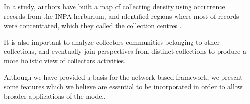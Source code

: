 In a study, authors have built a map of collecting density using occurrence records from the INPA herbarium, and identified regions where most of records were concentrated, which they called the collection centres \cite{Nelson1990}.


It is also important to analyze collectors communities belonging to other collections, and eventually join perspectives from distinct collections to produce a more holistic view of collectors activities.





Although we have provided a basis for the network-based framework, we present some features which we believe are essential to be incorporated in order to allow broader applications of the model.


% 


